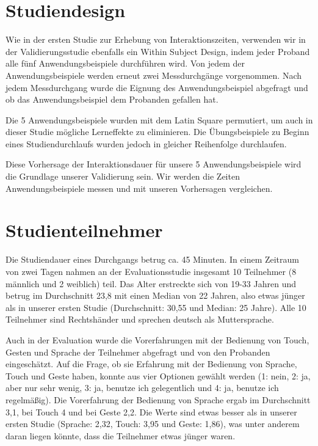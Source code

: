 \section[Studiendesign]{Studiendesign}
Wie in der ersten Studie zur Erhebung von Interaktionszeiten, verwenden wir in der Validierungsstudie ebenfalls ein Within Subject Design, indem jeder Proband alle fünf Anwendungsbeispiele durchführen wird. 
Von jedem der Anwendungsbeispiele werden erneut zwei Messdurchgänge vorgenommen. 
Nach jedem Messdurchgang wurde die Eignung des Anwendungsbeispiel abgefragt und ob das Anwendungsbeispiel dem Probanden gefallen hat.

Die 5 Anwendungsbeispiele wurden mit dem Latin Square permutiert, um auch in dieser Studie mögliche Lerneffekte zu eliminieren. Die Übungsbeispiele zu Beginn eines Studiendurchlaufs wurden jedoch in gleicher Reihenfolge durchlaufen. 

Diese Vorhersage der Interaktionsdauer für unsere 5 Anwendungsbeispiele wird die Grundlage unserer Validierung sein. 
Wir werden die Zeiten Anwendungsbeispiele messen und mit unseren Vorhersagen vergleichen. 

\section[Studienteilnehmer]{Studienteilnehmer}
Die Studiendauer eines Durchgangs betrug ca. 45 Minuten. In einem Zeitraum von zwei Tagen nahmen an der Evaluationsstudie insgesamt 10 Teilnehmer (8 männlich und 2 weiblich) teil. Das Alter erstreckte sich von 19-33 Jahren und betrug im Durchschnitt 23,8 mit einen Median von 22 Jahren, also etwas jünger als in unserer ersten Studie (Durchschnitt: 30,55 und Median: 25 Jahre). Alle 10 Teilnehmer sind Rechtshänder und sprechen deutsch als Muttersprache. 

Auch in der Evaluation wurde die Vorerfahrungen mit der Bedienung von Touch, Gesten und Sprache der Teilnehmer abgefragt und von den Probanden eingeschätzt. Auf die Frage, ob sie Erfahrung mit der Bedienung von Sprache, Touch und Geste haben, konnte aus vier Optionen gewählt werden (1: nein, 2: ja, aber nur sehr wenig, 3: ja, benutze ich gelegentlich und 4: ja, benutze ich regelmäßig). Die Vorerfahrung der Bedienung von Sprache ergab im Durchschnitt 3,1, bei Touch 4 und bei Geste 2,2. Die Werte sind etwas besser als in unserer ersten Studie (Sprache: 2,32,  Touch: 3,95 und Geste: 1,86), was unter anderem daran liegen könnte, dass die Teilnehmer etwas jünger waren.

